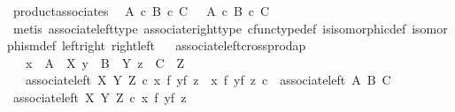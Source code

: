 \begin{isabellebody}
\endisatagproof
{\isafoldproof}%
%
\isadelimproof
\isanewline
%
\endisadelimproof
\isanewline
{}\isamarkupfalse%
\ product{\isacharunderscore}{\kern0pt}associates{\isacharcolon}{\kern0pt}\isanewline
\ \ {\isachardoublequoteopen}A\ {\isasymtimes}\isactrlsub c\ {\isacharparenleft}{\kern0pt}B\ {\isasymtimes}\isactrlsub c\ C{\isacharparenright}{\kern0pt}\ \ {\isasymcong}\ {\isacharparenleft}{\kern0pt}A\ {\isasymtimes}\isactrlsub c\ B{\isacharparenright}{\kern0pt}\ {\isasymtimes}\isactrlsub c\ C{\isachardoublequoteclose}\isanewline
%
\isadelimproof
\ \ \ \ %
\endisadelimproof
%
\isatagproof
{}\isamarkupfalse%
\ {\isacharparenleft}{\kern0pt}metis\ associate{\isacharunderscore}{\kern0pt}left{\isacharunderscore}{\kern0pt}type\ associate{\isacharunderscore}{\kern0pt}right{\isacharunderscore}{\kern0pt}type\ cfunc{\isacharunderscore}{\kern0pt}type{\isacharunderscore}{\kern0pt}def\ is{\isacharunderscore}{\kern0pt}isomorphic{\isacharunderscore}{\kern0pt}def\ isomorphism{\isacharunderscore}{\kern0pt}def\ left{\isacharunderscore}{\kern0pt}right\ right{\isacharunderscore}{\kern0pt}left{\isacharparenright}{\kern0pt}%
\endisatagproof
{\isafoldproof}%
%
\isadelimproof
\ \isanewline
%
\endisadelimproof
\isanewline
{}\isamarkupfalse%
\ associate{\isacharunderscore}{\kern0pt}left{\isacharunderscore}{\kern0pt}crossprod{\isacharunderscore}{\kern0pt}ap{\isacharcolon}{\kern0pt}\isanewline
\ \ \ {\isachardoublequoteopen}x\ {\isacharcolon}{\kern0pt}\ A\ {\isasymrightarrow}\ X{\isachardoublequoteclose}\ {\isachardoublequoteopen}y\ {\isacharcolon}{\kern0pt}\ B\ {\isasymrightarrow}\ Y{\isachardoublequoteclose}\ {\isachardoublequoteopen}z\ {\isacharcolon}{\kern0pt}\ C\ {\isasymrightarrow}\ Z{\isachardoublequoteclose}\isanewline
\ \ \ {\isachardoublequoteopen}associate{\isacharunderscore}{\kern0pt}left\ X\ Y\ Z\ {\isasymcirc}\isactrlsub c\ {\isacharparenleft}{\kern0pt}x\ {\isasymtimes}\isactrlsub f\ {\isacharparenleft}{\kern0pt}y{\isasymtimes}\isactrlsub f\ z{\isacharparenright}{\kern0pt}{\isacharparenright}{\kern0pt}\ {\isacharequal}{\kern0pt}\ {\isacharparenleft}{\kern0pt}{\isacharparenleft}{\kern0pt}x\ {\isasymtimes}\isactrlsub f\ y{\isacharparenright}{\kern0pt}{\isasymtimes}\isactrlsub f\ z{\isacharparenright}{\kern0pt}\ {\isasymcirc}\isactrlsub c\ \ associate{\isacharunderscore}{\kern0pt}left\ A\ B\ C{\isachardoublequoteclose}\isanewline
%
\isadelimproof
%
\endisadelimproof
%
\isatagproof
{}\isamarkupfalse%
{\isacharminus}{\kern0pt}\isanewline
\ \ \isamarkupfalse%
\ {\isachardoublequoteopen}associate{\isacharunderscore}{\kern0pt}left\ X\ Y\ Z\ {\isasymcirc}\isactrlsub c\ {\isacharparenleft}{\kern0pt}x\ {\isasymtimes}\isactrlsub f\ {\isacharparenleft}{\kern0pt}y{\isasymtimes}\isactrlsub f\ z{\isacharparenright}{\kern0pt}{\isacharparenright}{\kern0pt}\ {\isacharequal}{\kern0pt}\isanewline

\end{isabellebody}

